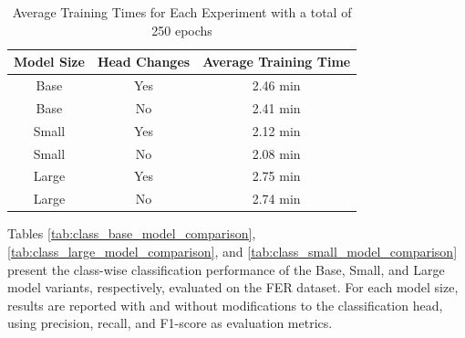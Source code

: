 \begin{table}[H]
\centering
\caption{Average Training Times for Each Experiment with a total of 250 epochs}
\label{tab:training_time_experiments}
\begin{tabular}{ccc}
\hline
\textbf{Model Size} & \textbf{Head Changes} & \textbf{Average Training Time}                             \\ \hline
Base                & Yes                   & 2.46 min                                 \\ 
Base                & No                    & 2.41 min                                 \\ 
Small               & Yes                   & 2.12 min                                 \\ 
Small               & No                    & 2.08 min                                 \\ 
Large               & Yes                   & 2.75 min                                 \\
Large               & No                    & 2.74 min
\end{tabular}
\end{table}



Tables \ref{tab:class_base_model_comparison}, \ref{tab:class_large_model_comparison}, and 
\ref{tab:class_small_model_comparison} present the class-wise classification performance of the Base, Small, and Large model variants, respectively, evaluated on the FER dataset. For each model size, results are reported with and without modifications to the classification head, using precision, recall, and F1-score as evaluation metrics.


